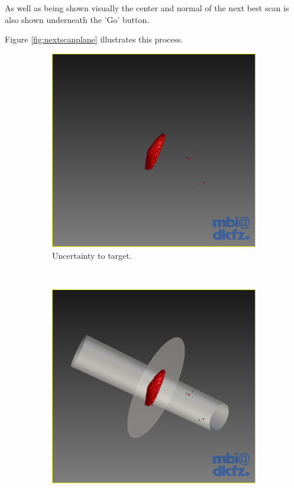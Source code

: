 As well as being shown visually the center and normal of the next best scan is also shown underneath the 'Go' button.

Figure \ref{fig:nextscanplane} illustrates this process.\\

\begin{figure}[H]
  \centering
  \begin{subfigure}[b]{0.32\textwidth}
    \includegraphics[width=\textwidth]{images/next_scan_plane/next_scan_plane_threshold.png}
    \caption*{Uncertainty to target.}
    \label{fig:nextscanplanethreshold}
  \end{subfigure}%
  ~ %
  \begin{subfigure}[b]{0.32\textwidth}
    \includegraphics[width=\textwidth]{images/next_scan_plane/next_scan_plane_1.png}

\end{subfigure}
\end{figure}
